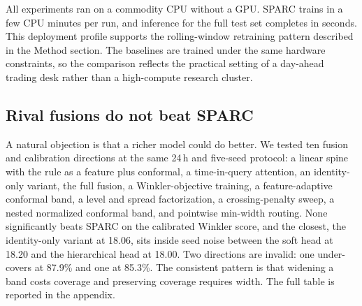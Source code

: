 \documentclass[twoside]{article}
\begin{document}
\begin{table}[t]
\centering
\small
\caption{SPARC hyperparameter configuration.}
\label{tab:hparams}
\end{table}

All experiments ran on a commodity CPU without a GPU. SPARC trains in a few CPU minutes per run, and inference for the full test set completes in seconds. This deployment profile supports the rolling-window retraining pattern described in the Method section. The baselines are trained under the same hardware constraints, so the comparison reflects the practical setting of a day-ahead trading desk rather than a high-compute research cluster.

\subsection{Rival fusions do not beat SPARC}
A natural objection is that a richer model could do better. We tested ten fusion and calibration directions at the same 24\,h and five-seed protocol: a linear spine with the rule as a feature plus conformal, a time-in-query attention, an identity-only variant, the full fusion, a Winkler-objective training, a feature-adaptive conformal band, a level and spread factorization, a crossing-penalty sweep, a nested normalized conformal band, and pointwise min-width routing. None significantly beats SPARC on the calibrated Winkler score, and the closest, the identity-only variant at 18.06, sits inside seed noise between the soft head at 18.20 and the hierarchical head at 18.00. Two directions are invalid: one under-covers at 87.9\% and one at 85.3\%. The consistent pattern is that widening a band costs coverage and preserving coverage requires width. The full table is reported in the appendix.
\end{document}
